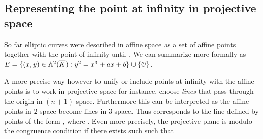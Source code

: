 \subsection{Representing the point at infinity in projective space}
\label{ssec:ch01.PointAtInfinityInProjectiveSpace}

So far elliptic curves were described in affine space as a set of affine points together with the point of infinity until . We can summarize more formally as $E = \{ {({x},{y})} \in { \ensuremath{\mathbb{A}} ^2(\ensuremath{\overline{K}} )}: y^2=x^3+ax+b \} \cup \{ \EuScript{O}\}$. 

A more precise way however to unify or include points at infinity with the affine points is to work in projective space for instance,  choose \textit{lines} that pass through the origin in $(n+1)$-space. Furthermore this can be interpreted as the affine points in $2$-space become
lines in $3$-space. Thus  corresponds to the line defined by points of the form , where \mathFormulaIsInSet{\lambda}{\FieldArbitraryClosure^*}.  Even more precisely, the \mathFormulaProjectivePlane projective plane  is   modulo the  congruence condition if there exists such \mathFormulaIsInSet{\lambda}{\FieldArbitraryClosure^*} such that 


